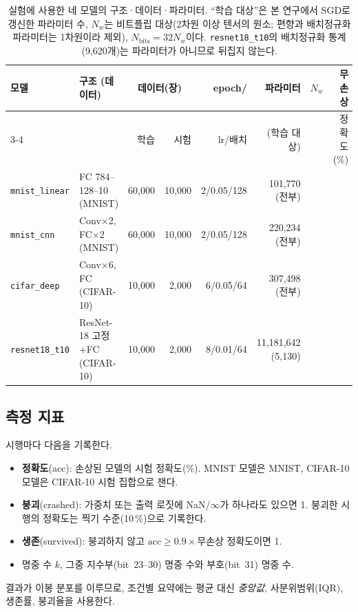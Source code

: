 \documentclass[11pt,a4paper]{article}
\newcommand{\code}[1]{\texttt{#1}}
\begin{document}
\begin{table}[H]
  \centering\scriptsize
  \caption{실험에 사용한 네 모델의 구조·데이터·파라미터. ``학습 대상''은 본 연구에서 SGD로 갱신한 파라미터 수, $N_w$는 비트플립 대상(2차원 이상 텐서의 원소; 편향과 배치정규화 파라미터는 1차원이라 제외), $N_{\mathrm{bits}}=32N_w$이다. \code{resnet18\_t10}의 배치정규화 통계(9{,}620개)는 파라미터가 아니므로 뒤집지 않는다.}
  \label{tab:model}
  \setlength{\tabcolsep}{2.5pt}
  \begin{tabular}{llrrrrrr}
    \toprule
    모델 & 구조 (데이터) & \multicolumn{2}{c}{데이터(장)} & epoch/ & 파라미터 & $N_w$ & 무손상 \\
    \cmidrule(lr){3-4}
     & & 학습 & 시험 & lr/배치 & (학습 대상) & & 정확도(\%) \\
    \midrule
    \code{mnist\_linear} & FC 784--128--10 (MNIST) & 60,000 & 10,000 & 2/0.05/128 & 101,770 (전부) & \NwLinear{} & \CleanLinear{} \\
    \code{mnist\_cnn} & Conv$\times$2, FC$\times$2 (MNIST) & 60,000 & 10,000 & 2/0.05/128 & 220,234 (전부) & \NwCnn{} & \CleanCnn{} \\
    \code{cifar\_deep} & Conv$\times$6, FC (CIFAR-10) & 10,000 & 2,000 & 6/0.05/64 & 307,498 (전부) & \NwCifar{} & \CleanCifar{} \\
    \code{resnet18\_t10} & ResNet-18 고정+FC (CIFAR-10) & 10,000 & 2,000 & 8/0.01/64 & 11,181,642 (5,130) & \NwResnet{} & \CleanResnet{} \\
    \bottomrule
  \end{tabular}
\end{table}

\subsection{측정 지표}
시행마다 다음을 기록한다.
\begin{itemize}[leftmargin=*]
  \item \textbf{정확도}(acc): 손상된 모델의 시험 정확도(\%). MNIST 모델은 MNIST, CIFAR-10 모델은 CIFAR-10 시험 집합으로 잰다.
  \item \textbf{붕괴}(crashed): 가중치 또는 출력 로짓에 NaN/$\infty$가 하나라도 있으면 1. 붕괴한 시행의 정확도는 찍기 수준(10\,\%)으로 기록한다.
  \item \textbf{생존}(survived): 붕괴하지 않고 $\mathrm{acc}\ge0.9\times$무손상 정확도이면 1.
  \item 명중 수 $k$, 그중 지수부(bit~23--30) 명중 수와 부호(bit~31) 명중 수.
\end{itemize}
결과가 이봉 분포를 이루므로, 조건별 요약에는 평균 대신 \emph{중앙값}, 사분위범위(IQR), 생존률, 붕괴율을 사용한다.
\end{document}
